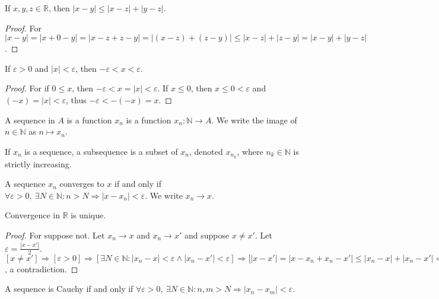 \documentclass[crop=false,class=article,oneside]{standalone}
\begin{document}
    \begin{corollary}
    If $x,y,z\in \mathbb{R}$, then $|x-y| \leq |x-z|+|y-z|$.
    \end{corollary}
    \begin{proof}
    For $|x-y| = |x+ 0 - y| = |x-z+z-y| = |(x-z)+(z-y)| \leq |x-z|+|z-y| = |x-y|+|y-z|$.
    \end{proof}
    \begin{corollary}
    If $\varepsilon >0$ and $|x|<\varepsilon$, then $-\varepsilon < x < \varepsilon$.
    \end{corollary}
    \begin{proof}
    For if $0\leq x$, then $-\varepsilon< x=|x|< \varepsilon$. If $x\leq 0$, then $x\leq 0<\varepsilon$ and $(-x)=|x|<\varepsilon$, thus $-\varepsilon < -(-x) = x$.
    \end{proof}
    \begin{definition}
    A sequence in $A$ is a function $x_n$ is a function $x_n:\mathbb{N}\rightarrow A$. We write the image of $n\in \mathbb{N}$ as $n\mapsto x_n$.
    \end{definition}
    \begin{definition}
    If $x_n$ is a sequence, a subsequence is a subset of $x_n$, denoted $x_{n_k}$, where $n_k\in \mathbb{N}$ is strictly increasing.
    \end{definition}
    \begin{definition}
    A sequence $x_n$ converges to $x$ if and only if $\forall \varepsilon>0,\ \exists N\in \mathbb{N}: n>N\Rightarrow |x-x_n|<\varepsilon$. We write $x_n \rightarrow x$.
    \end{definition}
    \begin{theorem}
    Convergence in $\mathbb{R}$ is unique.
    \end{theorem}
    \begin{proof}
    For suppose not. Let $x_n \rightarrow x$ and $x_n \rightarrow x'$ and suppose $x\ne x'$. Let $\varepsilon = \frac{|x-x'|}{2}$. $[x\ne x']\Rightarrow [\varepsilon>0]\Rightarrow [\exists N\in\mathbb{N}:|x_n-x|<\varepsilon\land |x_n-x'| <\varepsilon]\Rightarrow \big[|x-x'|=|x-x_n+x_n-x'|\leq |x_n-x|+|x_n-x'|<2\varepsilon = |x-x'|\big]$, a contradiction.
    \end{proof}
    \begin{definition}
    A sequence is Cauchy if and only if $\forall \varepsilon>0,\ \exists N\in \mathbb{N}: n,m>N\Rightarrow |x_n-x_m|<\varepsilon$.
    \end{definition}
\end{document}
